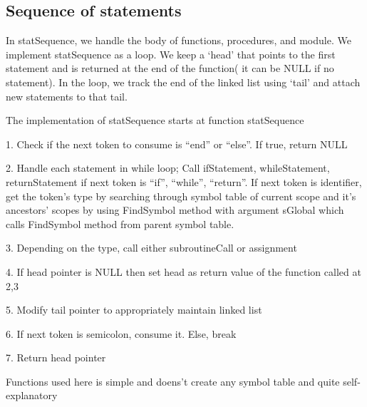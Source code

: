 \documentclass[12pt]{article}
\begin{document}
\subsection{Sequence of statements}

In statSequence, we handle the body of functions, procedures, and module. We implement statSequence as a loop.
We keep a ‘head’ that points to the first statement and is returned at the end of the function( it can be NULL if no statement).
In the loop, we track the end of the linked list using ‘tail’ and attach new statements to that tail.
\begin{MyIndentedList}
    \item The implementation of statSequence starts at function statSequence
    \begin{MyIndentedList}
        \item 1.	Check if the next token to consume is “end” or “else”. If true, return NULL
        \item 2.	Handle each statement in while loop; Call ifStatement, whileStatement, returnStatement if next token is “if”, “while”, “return”.
        If next token is identifier, get the token’s type by searching through symbol table of current scope and it’s ancestors’ scopes by using FindSymbol method with argument sGlobal which calls FindSymbol method from parent symbol table.
        \item 3.	Depending on the type, call either subroutineCall or assignment 
        \item 4.	If head pointer is NULL then set head as return value of the function called at 2,3
        \item 5.	Modify tail pointer to appropriately maintain linked list
        \item 6.	If next token is semicolon, consume it. Else, break
        \item 7.	Return head pointer                
    \end{MyIndentedList}
\end{MyIndentedList}
Functions used here is simple and doens’t create any symbol table and quite self-explanatory
\end{document}
